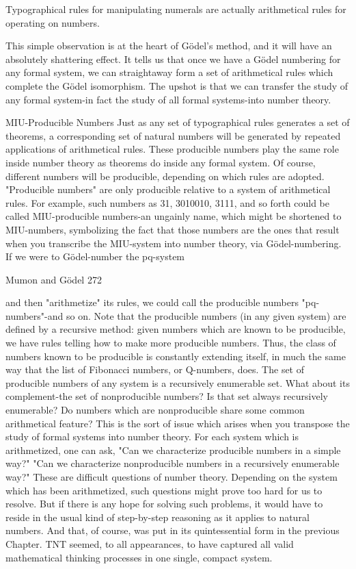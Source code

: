       Typographical rules for manipulating numerals are actually arithmetical rules for
      operating on numbers.

This simple observation is at the heart of Gödel’s method, and it will have an absolutely
shattering effect. It tells us that once we have a Gödel numbering for any formal system,
we can straightaway form a set of arithmetical rules which complete the Gödel
isomorphism. The upshot is that we can transfer the study of any formal system-in fact
the study of all formal systems-into number theory.

                              MIU-Producible Numbers
Just as any set of typographical rules generates a set of theorems, a corresponding set of
natural numbers will be generated by repeated applications of arithmetical rules. These
producible numbers play the same role inside number theory as theorems do inside any
formal system. Of course, different numbers will be producible, depending on which
rules are adopted. "Producible numbers" are only producible relative to a system of
arithmetical rules. For example, such numbers as 31, 3010010, 3111, and so forth could
be called MIU-producible numbers-an ungainly name, which might be shortened to
MIU-numbers, symbolizing the fact that those numbers are the ones that result when you
transcribe the MIU-system into number theory, via Gödel-numbering. If we were to
Gödel-number the pq-system


Mumon and Gödel                                                                        272

and then "arithmetize" its rules, we could call the producible numbers "pq-numbers"-and
so on.
       Note that the producible numbers (in any given system) are defined by a recursive
method: given numbers which are known to be producible, we have rules telling how to
make more producible numbers. Thus, the class of numbers known to be producible is
constantly extending itself, in much the same way that the list of Fibonacci numbers, or
Q-numbers, does. The set of producible numbers of any system is a recursively
enumerable set. What about its complement-the set of nonproducible numbers? Is that set
always recursively enumerable? Do numbers which are nonproducible share some
common arithmetical feature?
       This is the sort of issue which arises when you transpose the study of formal
systems into number theory. For each system which is arithmetized, one can ask, "Can
we characterize producible numbers in a simple way?" "Can we characterize
nonproducible numbers in a recursively enumerable way?" These are difficult questions
of number theory. Depending on the system which has been arithmetized, such questions
might prove too hard for us to resolve. But if there is any hope for solving such problems,
it would have to reside in the usual kind of step-by-step reasoning as it applies to natural
numbers. And that, of course, was put in its quintessential form in the previous Chapter.
TNT seemed, to all appearances, to have captured all valid mathematical thinking
processes in one single, compact system.

